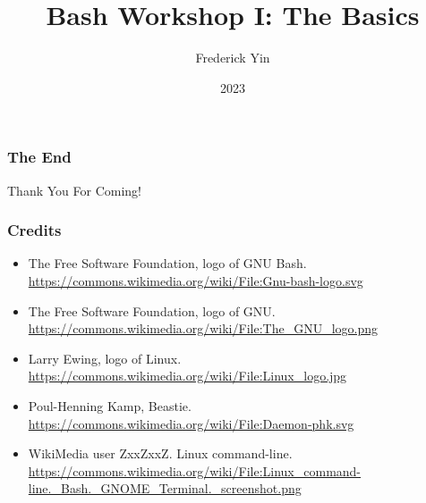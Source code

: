\documentclass{beamer}
\title{Bash Workshop I: The Basics}
\author{Frederick Yin}
\institute{JITech}
\date{2023}
\begin{document}
\frame{\titlepage}






\begin{frame}
\frametitle{The End}
\vspace{1cm}
\centering \Huge {Thank You For Coming!}
\end{frame}

\begin{frame}
\frametitle{Credits}
\begin{itemize}
    \item The Free Software Foundation, logo of GNU Bash.
        \url{https://commons.wikimedia.org/wiki/File:Gnu-bash-logo.svg}
    \item The Free Software Foundation, logo of GNU.
        \url{https://commons.wikimedia.org/wiki/File:The_GNU_logo.png}
    \item Larry Ewing, logo of Linux.
        \url{https://commons.wikimedia.org/wiki/File:Linux_logo.jpg}
    \item Poul-Henning Kamp, Beastie.
        \url{https://commons.wikimedia.org/wiki/File:Daemon-phk.svg}
    \item WikiMedia user ZxxZxxZ. Linux command-line.
        \url{https://commons.wikimedia.org/wiki/File:Linux_command-line._Bash._GNOME_Terminal._screenshot.png}
\end{itemize}
\end{frame}
\end{document}
